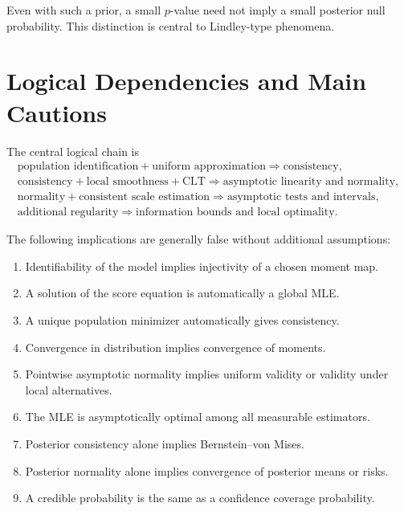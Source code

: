 Even with such a prior, a small $p$-value need not imply a small
posterior null probability. This distinction is central to
Lindley-type phenomena.

\section{Logical Dependencies and Main Cautions}

The central logical chain is
\[
\begin{gathered}
\text{population identification}
+\text{uniform approximation}
\Longrightarrow\text{consistency},\\
\text{consistency}
+\text{local smoothness}
+\text{CLT}
\Longrightarrow\text{asymptotic linearity and normality},\\
\text{normality}
+\text{consistent scale estimation}
\Longrightarrow\text{asymptotic tests and intervals},\\
\text{additional regularity}
\Longrightarrow\text{information bounds and local optimality}.
\end{gathered}
\]

The following implications are generally false without additional
assumptions:
\begin{enumerate}
\item Identifiability of the model implies injectivity of a chosen
moment map.
\item A solution of the score equation is automatically a global MLE.
\item A unique population minimizer automatically gives consistency.
\item Convergence in distribution implies convergence of moments.
\item Pointwise asymptotic normality implies uniform validity or
validity under local alternatives.
\item The MLE is asymptotically optimal among all measurable estimators.
\item Posterior consistency alone implies Bernstein--von Mises.
\item Posterior normality alone implies convergence of posterior means
or risks.
\item A credible probability is the same as a confidence coverage
probability.
\end{enumerate}